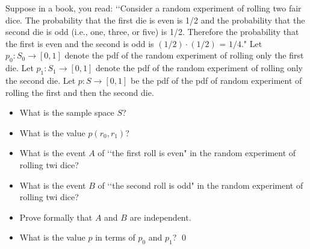Suppose in a book, you read:
\lq\lq Consider a random experiment of rolling two fair dice.
The probability that the first die is even is 1/2
and the probability that the second die is odd (i.e., one, three, or five) is 1/2.
Therefore the probability that the first is
even and the second is odd is $(1/2)\cdot(1/2)$ = $1/4$."
Let
$p_0 : S_0 \rightarrow [0,1]$
denote the pdf of the random experiment of rolling only
the first die.
Let
$p_1 : S_1 \rightarrow [0,1]$
denote the pdf of the random experiment of rolling only
the second die.
Let $p : S \rightarrow [0,1]$ be the pdf of the pdf of
random experiment of rolling the first and then the second die. 
\begin{itemize}
\item What is the sample space $S$?
\item What is the value $p(r_0, r_1)$?
\item What is the event $A$ of \lq\lq the first roll is even" in the random experiment of rolling twi dice?
\item What is the event $B$ of \lq\lq the second roll is odd" in the random experiment of rolling twi dice?
\item Prove formally that $A$ and $B$ are independent.
\item What is the value $p$ in terms of $p_0$ and $p_1$?
  \qed
\end{itemize}
